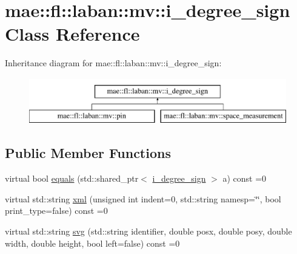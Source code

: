 \hypertarget{classmae_1_1fl_1_1laban_1_1mv_1_1i__degree__sign}{\section{mae\-:\-:fl\-:\-:laban\-:\-:mv\-:\-:i\-\_\-degree\-\_\-sign Class Reference}
\label{classmae_1_1fl_1_1laban_1_1mv_1_1i__degree__sign}
}
Inheritance diagram for mae\-:\-:fl\-:\-:laban\-:\-:mv\-:\-:i\-\_\-degree\-\_\-sign\-:\begin{figure}[H]
\begin{center}
\leavevmode
\includegraphics[height=2.000000cm]{classmae_1_1fl_1_1laban_1_1mv_1_1i__degree__sign}
\end{center}
\end{figure}
\subsection*{Public Member Functions}
\begin{DoxyCompactItemize}
\item 
virtual bool \hyperlink{classmae_1_1fl_1_1laban_1_1mv_1_1i__degree__sign_a65fee11b31d29709fd4022f90f4638bd}{equals} (std\-::shared\-\_\-ptr$<$ \hyperlink{classmae_1_1fl_1_1laban_1_1mv_1_1i__degree__sign}{i\-\_\-degree\-\_\-sign} $>$ a) const =0
\item 
virtual std\-::string \hyperlink{classmae_1_1fl_1_1laban_1_1mv_1_1i__degree__sign_abddf8459a5231b204ac2f023633aa4c4}{xml} (unsigned int indent=0, std\-::string namesp=\char`\"{}\char`\"{}, bool print\-\_\-type=false) const =0
\item 
virtual std\-::string \hyperlink{classmae_1_1fl_1_1laban_1_1mv_1_1i__degree__sign_abb3ff23c8dcaaa80b6062bf5f8162c51}{svg} (std\-::string identifier, double posx, double posy, double width, double height, bool left=false) const =0
\end{DoxyCompactItemize}


